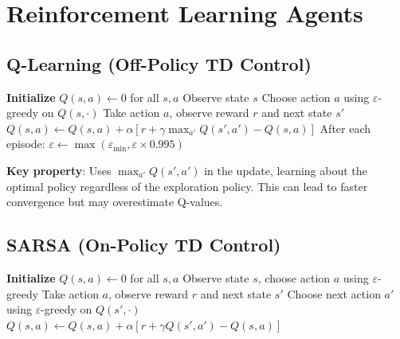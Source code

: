 \documentclass[12pt, a4paper]{article}
\begin{document}
\section{Reinforcement Learning Agents}

\subsection{Q-Learning (Off-Policy TD Control)}

\begin{algorithm}[H]
\caption{Q-Learning Agent Update}
\begin{algorithmic}[1]
\State \textbf{Initialize} $Q(s, a) \leftarrow 0$ for all $s, a$
    \State Observe state $s$
    \State Choose action $a$ using $\varepsilon$-greedy on $Q(s, \cdot)$
    \State Take action $a$, observe reward $r$ and next state $s'$
    \State $Q(s, a) \leftarrow Q(s, a) + \alpha \left[ r + \gamma \max_{a'} Q(s', a') - Q(s, a) \right]$
\EndFor
\State After each episode: $\varepsilon \leftarrow \max(\varepsilon_{\min}, \varepsilon \times 0.995)$
\end{algorithmic}
\end{algorithm}

\textbf{Key property}: Uses $\max_{a'} Q(s', a')$ in the update, learning about the optimal policy regardless of the exploration policy. This can lead to faster convergence but may overestimate Q-values.

\subsection{SARSA (On-Policy TD Control)}

\begin{algorithm}[H]
\caption{SARSA Agent Update}
\begin{algorithmic}[1]
\State \textbf{Initialize} $Q(s, a) \leftarrow 0$ for all $s, a$
    \State Observe state $s$, choose action $a$ using $\varepsilon$-greedy
    \State Take action $a$, observe reward $r$ and next state $s'$
    \State Choose next action $a'$ using $\varepsilon$-greedy on $Q(s', \cdot)$
    \State $Q(s, a) \leftarrow Q(s, a) + \alpha \left[ r + \gamma Q(s', a') - Q(s, a) \right]$
\EndFor
\end{algorithmic}
\end{algorithm}
\end{document}
